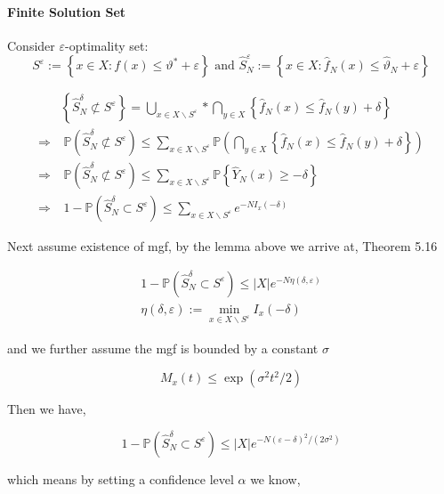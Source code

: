 \documentclass[a4pper,10pt]{article}
\newcommand{\pr}{\mathbb P}
\begin{document}
\paragraph{Finite Solution Set}
Consider $\varepsilon$-optimality set:
$$S^{\varepsilon}:=\left\{x \in X: f(x) \leq \vartheta^{*}+\varepsilon\right\} \text { and } \hat{S}_{N}^{\varepsilon}:=\left\{x \in X: \hat{f}_{N}(x) \leq \hat{\vartheta}_{N}+\varepsilon\right\}$$

$$\begin{aligned}
		            & \left\{\hat{S}_{N}^{\delta} \not \subset S^{\varepsilon}\right\}=\bigcup_{x \in X \backslash S^{\varepsilon}} * \bigcap_{y \in X}\left\{\hat{f}_{N}(x) \leq \hat{f}_{N}(y)+\delta\right\}                   \\
		\Rightarrow & ~\pr\left(\hat{S}_{N}^{\delta} \not \subset S^{\varepsilon}\right) \leq \sum_{x \in X \backslash S^{\varepsilon}} \pr\left(\bigcap_{y \in X}\left\{\hat{f}_{N}(x) \leq \hat{f}_{N}(y)+\delta\right\}\right) \\
		\Rightarrow & ~\pr\left(\hat{S}_{N}^{\delta} \not \subset S^{\varepsilon}\right) \leq \sum_{x \in X \backslash S^{\varepsilon}} \pr \left\{\hat{Y}_{N}(x) \geq-\delta\right\}                                             \\
		\Rightarrow & ~		1-\pr\left(\hat{S}_{N}^{\delta} \subset S^{\varepsilon}\right) \leq \sum_{x \in X \backslash S^{\varepsilon}} e^{-N I_{x}(-\delta)}
	\end{aligned}
$$

Next assume existence of mgf, by the lemma above we arrive at, Theorem 5.16

$$\begin{gathered}
		1-\pr\left(\hat{S}_{N}^{\delta} \subset S^{\varepsilon}\right) \leq|X| e^{-N \eta(\delta, \varepsilon)} \\
		\eta(\delta, \varepsilon):=\min _{x \in X \backslash S^{\varepsilon}} I_{x}(-\delta)
	\end{gathered}
$$

and we further assume the mgf is bounded by a constant $\sigma$

$$
	M_{x}(t) \leq \exp \left(\sigma^{2} t^{2} / 2\right)
$$

Then we have,

$$
	1-\pr\left(\hat{S}_{N}^{\delta} \subset S^{\varepsilon}\right) \leq|X| e^{-N(\varepsilon-\delta)^{2} /\left(2 \sigma^{2}\right)}
$$

which means by setting a confidence level $\alpha$ we know,
\end{document}

